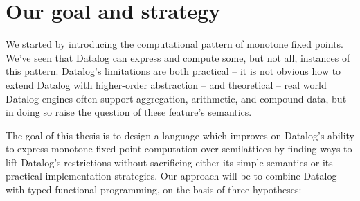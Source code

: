 



\section{Our goal and strategy}

We started by introducing the computational pattern of monotone fixed points.
We've seen that Datalog can express and compute some, but not all, instances of
this pattern. Datalog's limitations are both practical -- it is not obvious how
to extend Datalog with higher-order abstraction -- and theoretical -- real world
Datalog engines often support aggregation, arithmetic, and compound data, but in
doing so raise the question of these feature's semantics.


The goal of this thesis is to design a language which improves on Datalog's
ability to express monotone fixed point computation over semilattices by finding
ways to lift Datalog's restrictions without sacrificing either its simple
semantics or its practical implementation strategies.
%
Our approach will be to combine Datalog with typed functional programming, on the basis of three hypotheses:

